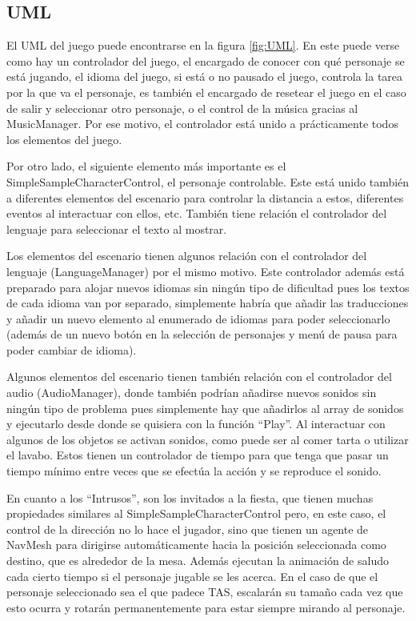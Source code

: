 \documentclass[12pt, a4paper,twoside,titlepage]{book}
\begin{document}
\subsection{UML}

El UML del juego puede encontrarse en la figura \ref{fig:UML}. En este puede verse como hay un controlador del juego, el encargado de conocer con qué personaje se está jugando, el idioma del juego, si está o no pausado el juego, controla la tarea por la que va el personaje, es también el encargado de resetear el juego en el caso de salir y seleccionar otro personaje, o el control de la música gracias al MusicManager. Por ese motivo, el controlador está unido a prácticamente todos los elementos del juego. 

Por otro lado, el siguiente elemento más importante es el SimpleSampleCharacterControl, el personaje controlable. Este está unido también a diferentes elementos del escenario para controlar la distancia a estos, diferentes eventos al interactuar con ellos, etc. También tiene relación el controlador del lenguaje para seleccionar el texto al mostrar. 

Los elementos del escenario tienen algunos relación con el controlador del lenguaje (LanguageManager) por el mismo motivo. Este controlador además está preparado para alojar nuevos idiomas sin ningún tipo de dificultad pues los textos de cada idioma van por separado, simplemente habría que añadir las traducciones y añadir un nuevo elemento al enumerado de idiomas para poder seleccionarlo (además de un nuevo botón en la selección de personajes y menú de pausa para poder cambiar de idioma). 

Algunos elementos del escenario tienen también relación con el controlador del audio (AudioManager), donde también podrían añadirse nuevos sonidos sin ningún tipo de problema pues simplemente hay que añadirlos al array de sonidos y ejecutarlo desde donde se quisiera con la función ``Play''. Al interactuar con algunos de los objetos se activan sonidos, como puede ser al comer tarta o utilizar el lavabo. Estos tienen un controlador de tiempo para que tenga que pasar un tiempo mínimo entre veces que se efectúa la acción y se reproduce el sonido. 

En cuanto a los ``Intrusos'', son los invitados a la fiesta, que tienen muchas propiedades similares al SimpleSampleCharacterControl pero, en este caso, el control de la dirección no lo hace el jugador, sino que tienen un agente de NavMesh para dirigirse automáticamente hacia la posición seleccionada como destino, que es alrededor de la mesa. Además ejecutan la animación de saludo cada cierto tiempo si el personaje jugable se les acerca. En el caso de que el personaje seleccionado sea el que padece TAS, escalarán su tamaño cada vez que esto ocurra y rotarán permanentemente para estar siempre mirando al personaje.  
\end{document}
